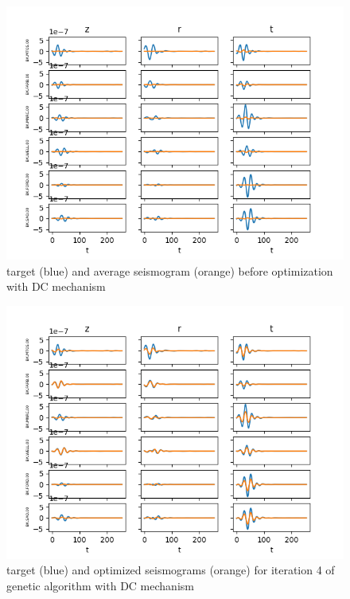 \documentclass{article}
\begin{document}
\begin{figure}[H]
	\centering
	\includegraphics{dataSet1/plots/optimized0.png}
	\caption{target (blue) and average seismogram (orange) before optimization with DC mechanism}
	\label{convergenceDC1}
\end{figure}
\begin{figure}[H]
	\centering
	\includegraphics{dataSet1/plots/optimized3.png}
	\caption{target (blue) and optimized seismograms (orange) for iteration 4 of genetic algorithm with DC mechanism}
	\label{convergenceDC2}
\end{figure}
\end{document}

